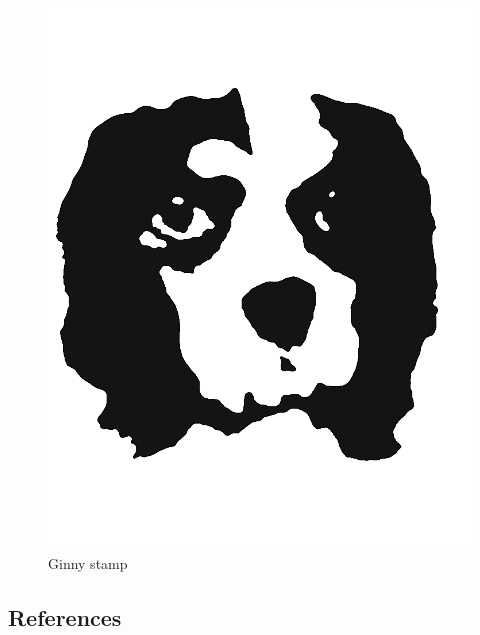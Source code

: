 \begin{fignos:no-prefix-figure-caption}

\begin{figure}
\centering
\includegraphics{images/ginny_stamp_pic.png}
\caption{Ginny stamp}
\end{figure}

\end{fignos:no-prefix-figure-caption}

\hypertarget{references}{%
\subsection{References}\label{references}}

